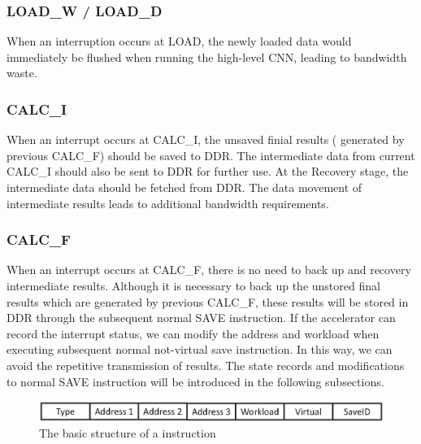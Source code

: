 \subsubsection{LOAD\_W / LOAD\_D }
When an interruption occurs at LOAD, the newly loaded data would immediately be flushed when running the high-level CNN, leading to bandwidth waste.

\subsubsection{CALC\_I} 
When an interrupt occurs at CALC\_I, the unsaved finial results ( generated by previous CALC\_F) should be saved to DDR. The intermediate data from current CALC\_I should also be sent to DDR for further use. At the Recovery stage, the intermediate data should be fetched from DDR. The data movement of intermediate results leads to additional bandwidth requirements.


\subsubsection{CALC\_F}
When an interrupt occurs at CALC\_F, there is no need to back up and recovery intermediate results. Although it is necessary to back up the unstored final results which are generated by previous CALC\_F, these results will be stored in DDR through the subsequent normal SAVE instruction.
If the accelerator can record the interrupt status, we can modify the address and workload when executing subsequent normal not-virtual save instruction.
In this way, we can avoid the repetitive transmission of results.
The state records and modifications to normal SAVE instruction will be introduced in the following subsections.

\begin{figure}[h]
	\centering
	\includegraphics[width=0.99\linewidth]{fig/virtual_instr.eps}
	\caption{The basic structure of a instruction }
	\label{fig:virtual_instr}
\end{figure}



